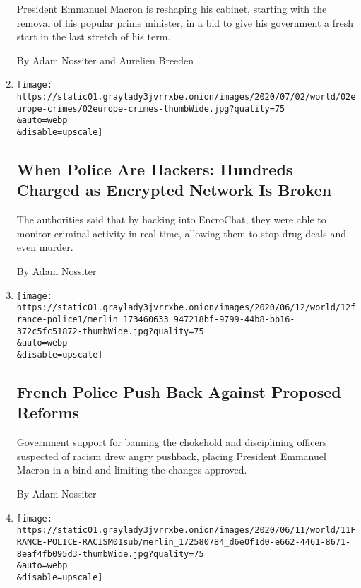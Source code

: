 \begin{enumerate}
  President Emmanuel Macron is reshaping his cabinet, starting with the
  removal of his popular prime minister, in a bid to give his government
  a fresh start in the last stretch of his term.

  By Adam Nossiter and Aurelien Breeden
\item
  \href{/2020/07/02/world/europe/encrypted-network-arrests-europe.html}{}

  \texttt{[image: https://static01.graylady3jvrrxbe.onion/images/2020/07/02/world/02europe-crimes/02europe-crimes-thumbWide.jpg?quality=75\\\&auto=webp\\\&disable=upscale]}

  \hypertarget{when-police-are-hackers-hundreds-charged-as-encrypted-network-is-broken}{%
  \subsection{When Police Are Hackers: Hundreds Charged as Encrypted
  Network Is
  Broken}\label{when-police-are-hackers-hundreds-charged-as-encrypted-network-is-broken}}

  The authorities said that by hacking into EncroChat, they were able to
  monitor criminal activity in real time, allowing them to stop drug
  deals and even murder.

  By Adam Nossiter
\item
  \href{/2020/06/12/world/europe/france-police-opposition-proposed-reforms.html}{}

  \texttt{[image: https://static01.graylady3jvrrxbe.onion/images/2020/06/12/world/12france-police1/merlin\_173460633\_947218bf-9799-44b8-bb16-372c5fc51872-thumbWide.jpg?quality=75\\\&auto=webp\\\&disable=upscale]}

  \hypertarget{french-police-push-back-against-proposed-reforms}{%
  \subsection{French Police Push Back Against Proposed
  Reforms}\label{french-police-push-back-against-proposed-reforms}}

  Government support for banning the chokehold and disciplining officers
  suspected of racism drew angry pushback, placing President Emmanuel
  Macron in a bind and limiting the changes approved.

  By Adam Nossiter
\item
  \href{/2020/06/12/world/europe/george-floyd-protests-europe-police.html}{}

  \texttt{[image: https://static01.graylady3jvrrxbe.onion/images/2020/06/11/world/11FRANCE-POLICE-RACISM01sub/merlin\_172580784\_d6e0f1d0-e662-4461-8671-8eaf4fb095d3-thumbWide.jpg?quality=75\\\&auto=webp\\\&disable=upscale]}


\end{enumerate}
